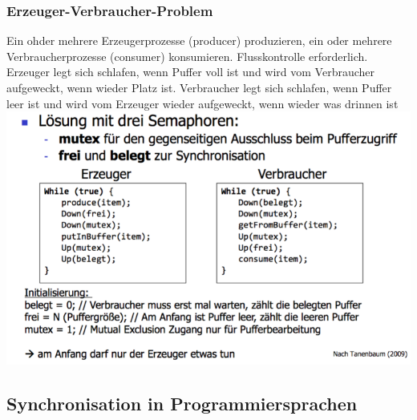 \documentclass[10pt,a4paper,landscape]{article}
\begin{document}
\begin{multicols*}{3}
	\subsubsection{Erzeuger-Verbraucher-Problem}
	Ein ohder mehrere Erzeugerprozesse (producer) produzieren, ein oder mehrere Verbraucherprozesse (consumer) konsumieren. Flusskontrolle erforderlich. Erzeuger legt sich schlafen, wenn Puffer voll ist und wird vom Verbraucher aufgeweckt, wenn wieder Platz ist. Verbraucher legt sich schlafen, wenn Puffer leer ist und wird vom Erzeuger wieder aufgeweckt, wenn wieder was drinnen ist\\
	\includegraphics[width=0.9\columnwidth]{erzeuger-verbraucher}
	\subsection{Synchronisation in Programmiersprachen}

\end{multicols*}
\end{document}
